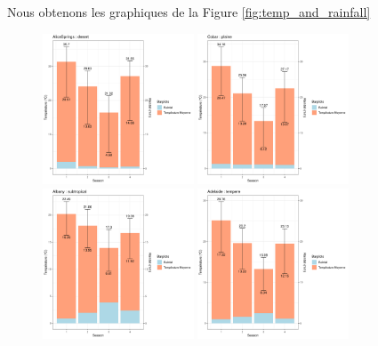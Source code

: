 \documentclass{article}
\begin{document}
Nous obtenons les graphiques de la Figure \ref{fig:temp_and_rainfall}

\begin{figure}[p]
    \centering
        \includegraphics[page=1,width=0.4\textwidth]{Images/Temp_and_Rainfalldesert.pdf}
        \includegraphics[page=1,width=0.4\textwidth]{Images/Temp_and_Rainfallplaine.pdf}
        \includegraphics[page=1,width=0.4\textwidth]{Images/Temp_and_Rainfallsubtropical.pdf}
        \includegraphics[page=1,width=0.4\textwidth]{Images/Temp_and_Rainfalltempere.pdf}

\end{figure}
\end{document}
